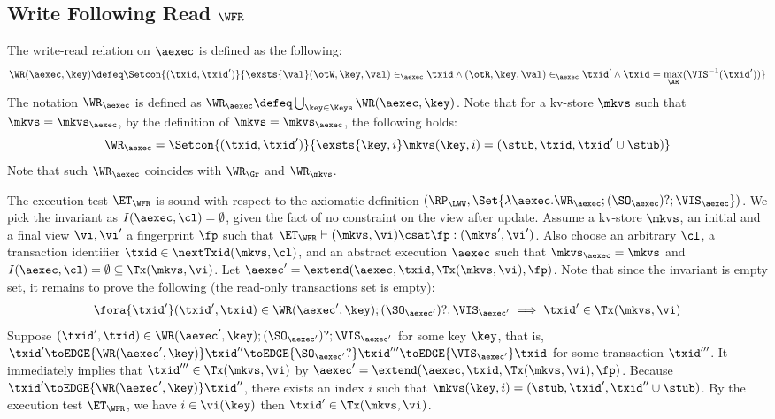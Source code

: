 \subsection{Write Following Read \( \WFR \) }
\label{sec:sound-complete-wfr}

The write-read relation  on \( \aexec \) is defined as the following:
\[
\WR(\aexec, \key) \defeq \Setcon{ (\txid, \txid') }{ \exsts{\val} (\otW, \key, \val) \in_\aexec \txid \land (\otR, \key, \val) \in_\aexec \txid' \land \txid = \max_\AR(\VIS^{-1}(\txid')) }
\]
The notation \( \WR_\aexec \) is defined as \( \WR_\aexec \defeq \bigcup_{\key \in \Keys} \WR(\aexec, \key) \).
Note that for a kv-store \( \mkvs \) such that \( \mkvs = \mkvs_\aexec \),
by the definition of  \(  \mkvs = \mkvs_\aexec \), 
the following holds:
\[
    \WR_\aexec = \Setcon{(\txid, \txid')}{\exsts{\key, i } \mkvs(\key, i) = (\stub, \txid, \txid'\cup \stub)}
\]
Note that such \( \WR_\aexec \) coincides with \( \WR_\Gr \) and \( \WR_\mkvs \).

The execution test $\ET_\WFR$ is sound with respect to the axiomatic definition 
\( (\RP_{\LWW}, \Set{\lambda \aexec. \WR_\aexec ; (\SO_{\aexec})? ; \VIS_{\aexec} })\).
We pick the invariant as \( I( \aexec, \cl ) = \emptyset \), given the fact of no constraint on the view after update.
Assume a kv-store $\mkvs$, an initial and a final view $\vi, \vi'$  a fingerprint $\fp$ 
such that $\ET_{\WFR} \vdash (\mkvs, \vi) \csat \fp: (\mkvs', \vi')$. 
Also choose an arbitrary $\cl$, a transaction identifier $\txid \in \nextTxid(\mkvs, \cl)$, 
and an abstract execution $\aexec$ such that $\mkvs_{\aexec} = \mkvs$ and 
\( I(\aexec, \cl) =  \emptyset \subseteq \Tx(\mkvs, \vi) \).
Let \( \aexec' = \extend(\aexec, \txid, \Tx(\mkvs, \vi) , \fp ) \).
Note that since the invariant is empty set, it remains to prove the following (the read-only transactions set is empty):
\[
    \begin{array}{@{}l@{}}
        \fora{ \txid' } 
        (\txid' ,\txid)  \in \WR(\aexec',\key) ; (\SO_{\aexec'})? ; \VIS_{\aexec'} 
        \implies \txid' \in \Tx(\mkvs, \vi) 
    \end{array}
\]
Suppose \( (\txid' ,\txid)  \in \WR(\aexec', \key) ; (\SO_{\aexec'})? ; \VIS_{\aexec'} \) for some key \( \key \),
that is, \( \txid' \toEDGE{\WR(\aexec', \key)} \txid'' \toEDGE{\SO_{\aexec'}?} \txid''' \toEDGE{\VIS_{\aexec'}} \txid \) for some transaction \( \txid''' \).
It immediately implies that \( \txid''' \in \Tx(\mkvs, \vi)  \) by \( \aexec' = \extend(\aexec, \txid, \Tx(\mkvs, \vi) , \fp ) \).
Because \( \txid' \toEDGE{\WR(\aexec', \key)} \txid'' \), there exists an index \( i \) such that \( \mkvs(\key, i) = (\stub, \txid', \txid'' \cup \stub) \).
By the execution test \( \ET_\WFR \), we have \( i \in \vi( \key ) \) then \( \txid' \in \Tx(\mkvs, \vi ) \).


